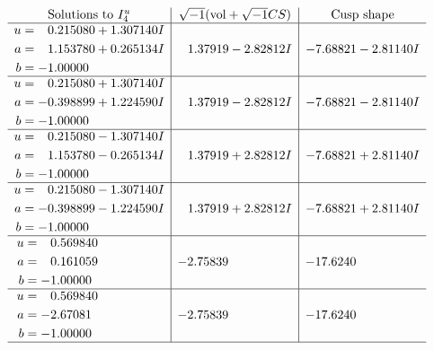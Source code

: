\documentclass[1p]{elsarticle_modified}
\theoremstyle{definition}
\newcommand{\I}{\sqrt{-1}}
\begin{document}
$$\begin{array}{c|c|c}  
\text{Solutions to }I^u_{4}& \I (\text{vol} + \sqrt{-1}CS) & \text{Cusp shape}\\
 \hline 
\begin{aligned}
u &= \phantom{-}0.215080 + 1.307140 I \\
a &= \phantom{-}1.153780 + 0.265134 I \\
b &= -1.00000\phantom{ +0.000000I}\end{aligned}
 & \phantom{-}1.37919 - 2.82812 I & -7.68821 - 2.81140 I \\ \hline\begin{aligned}
u &= \phantom{-}0.215080 + 1.307140 I \\
a &= -0.398899 + 1.224590 I \\
b &= -1.00000\phantom{ +0.000000I}\end{aligned}
 & \phantom{-}1.37919 - 2.82812 I & -7.68821 - 2.81140 I \\ \hline\begin{aligned}
u &= \phantom{-}0.215080 - 1.307140 I \\
a &= \phantom{-}1.153780 - 0.265134 I \\
b &= -1.00000\phantom{ +0.000000I}\end{aligned}
 & \phantom{-}1.37919 + 2.82812 I & -7.68821 + 2.81140 I \\ \hline\begin{aligned}
u &= \phantom{-}0.215080 - 1.307140 I \\
a &= -0.398899 - 1.224590 I \\
b &= -1.00000\phantom{ +0.000000I}\end{aligned}
 & \phantom{-}1.37919 + 2.82812 I & -7.68821 + 2.81140 I \\ \hline\begin{aligned}
u &= \phantom{-}0.569840\phantom{ +0.000000I} \\
a &= \phantom{-}0.161059\phantom{ +0.000000I} \\
b &= -1.00000\phantom{ +0.000000I}\end{aligned}
 & -2.75839\phantom{ +0.000000I} & -17.6240\phantom{ +0.000000I} \\ \hline\begin{aligned}
u &= \phantom{-}0.569840\phantom{ +0.000000I} \\
a &= -2.67081\phantom{ +0.000000I} \\
b &= -1.00000\phantom{ +0.000000I}\end{aligned}
 & -2.75839\phantom{ +0.000000I} & -17.6240\phantom{ +0.000000I}\\
 \hline 
 \end{array}$$\newpage\newpage\renewcommand{\arraystretch}{1}
\end{document}
